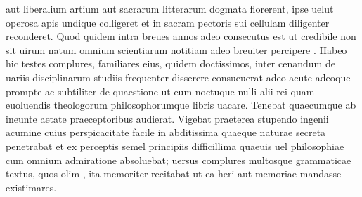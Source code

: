 \documentclass[a5paper,twoside]{article}
\begin{document}
 aut liberalium artium aut sacrarum litterarum dogmata florerent, ipse uelut operosa apis undique colligeret et in sacram pectoris sui cellulam diligenter reconderet. Quod quidem intra breues annos adeo consecutus est ut credibile non sit uirum 
 natum  omnium scientiarum notitiam adeo breuiter percipere . Habeo hic testes complures, familiares eius,  quidem doctissimos,  inter cenandum de uariis disciplinarum studiis frequenter disserere consueuerat adeo acute adeoque prompte ac subtiliter de quaestione  ut eum   noctuque nulli  alii rei quam euoluendis theologorum philosophorumque libris uacare. Tenebat  quaecumque ab ineunte aetate  praeceptoribus audierat. Vigebat praeterea stupendo ingenii acumine cuius perspicacitate facile in abditissima quaeque naturae secreta penetrabat et ex perceptis semel principiis difficillima quaeuis uel philosophiae    cum omnium admiratione absoluebat; uersus complures multosque grammaticae textus, quos olim  , ita memoriter recitabat ut ea  heri aut  memoriae mandasse existimares. 
\end{document}
